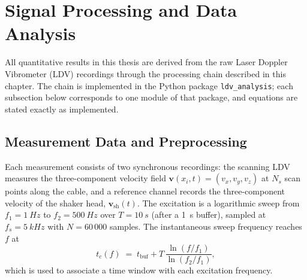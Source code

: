 %   

\section{Signal Processing and Data Analysis}
\label{sec:processing}

All quantitative results in this thesis are derived from the raw Laser
Doppler Vibrometer (LDV) recordings through the processing chain described in
this chapter. The chain is implemented in the Python package
\texttt{ldv\_analysis}; each subsection below corresponds to one module of
that package, and equations are stated exactly as implemented.

\subsection{Measurement Data and Preprocessing}
\label{sec:proc:preprocessing}

Each measurement consists of two synchronous recordings: the scanning LDV
measures the three-component velocity field
$\mathbf{v}(x_i, t) = (v_x, v_y, v_z)$ at $N_s$ scan points along the cable,
and a reference channel records the three-component velocity of the shaker
head, $\mathbf{v}_\mathrm{sh}(t)$. The excitation is a logarithmic sweep from
$f_1 = \SI{1}{Hz}$ to $f_2 = \SI{500}{Hz}$ over $T = \SI{10}{s}$ (after a
\SI{1}{s} buffer), sampled at $f_s = \SI{5}{kHz}$ with $N = 60\,000$ samples.
The instantaneous sweep frequency reaches $f$ at
\begin{equation}
  t_c(f) \;=\; t_\mathrm{buf} + T\,
    \frac{\ln\!\left(f/f_1\right)}{\ln\!\left(f_2/f_1\right)},
  \label{eq:sweeptime}
\end{equation}
which is used to associate a time window with each excitation frequency.

